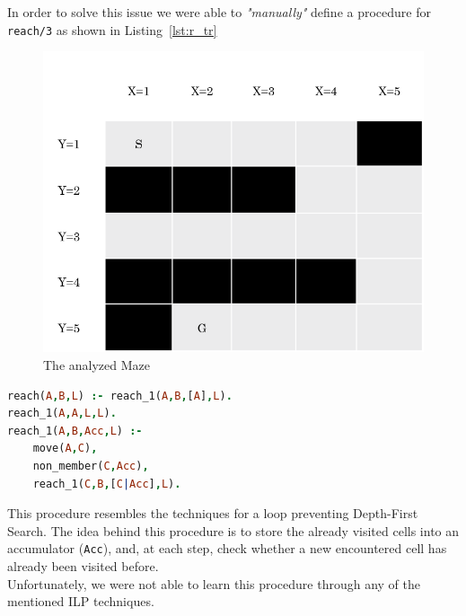 In order to solve this issue we were able to \emph{"manually"} define a procedure for \texttt{reach/3} as shown in Listing~\ref{lst:r_tr}

\begin{figure}
    \centering
    \includegraphics[scale=0.7]{img/ourMaze.png}
    \caption{The analyzed Maze}\label{fig:our}
\end{figure}

\begin{lstlisting}[label={lst:r_tr}, language=Prolog, caption=\texttt{reach/3} with tail recursion, belowcaptionskip=1cm]
reach(A,B,L) :- reach_1(A,B,[A],L).
reach_1(A,A,L,L).
reach_1(A,B,Acc,L) :-
    move(A,C),
    non_member(C,Acc),
    reach_1(C,B,[C|Acc],L). 
\end{lstlisting}
This procedure resembles the techniques for a loop preventing Depth-First Search. The idea behind this procedure is to store
the already visited cells into an accumulator (\texttt{Acc}), and, at each step, check whether a new encountered cell has already
been visited before.\\
Unfortunately, we were not able to learn this procedure through any of the mentioned ILP techniques.
